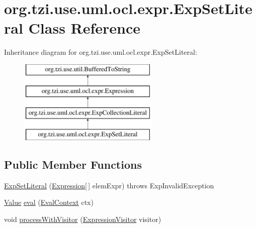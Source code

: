 \hypertarget{classorg_1_1tzi_1_1use_1_1uml_1_1ocl_1_1expr_1_1_exp_set_literal}{\section{org.\-tzi.\-use.\-uml.\-ocl.\-expr.\-Exp\-Set\-Literal Class Reference}
\label{classorg_1_1tzi_1_1use_1_1uml_1_1ocl_1_1expr_1_1_exp_set_literal}
}
Inheritance diagram for org.\-tzi.\-use.\-uml.\-ocl.\-expr.\-Exp\-Set\-Literal\-:\begin{figure}[H]
\begin{center}
\leavevmode
\includegraphics[height=4.000000cm]{classorg_1_1tzi_1_1use_1_1uml_1_1ocl_1_1expr_1_1_exp_set_literal}
\end{center}
\end{figure}
\subsection*{Public Member Functions}
\begin{DoxyCompactItemize}
\item 
\hyperlink{classorg_1_1tzi_1_1use_1_1uml_1_1ocl_1_1expr_1_1_exp_set_literal_ac43c7ba94f6b66019108b0341a8408e0}{Exp\-Set\-Literal} (\hyperlink{classorg_1_1tzi_1_1use_1_1uml_1_1ocl_1_1expr_1_1_expression}{Expression}\mbox{[}$\,$\mbox{]} elem\-Expr)  throws Exp\-Invalid\-Exception     
\item 
\hyperlink{classorg_1_1tzi_1_1use_1_1uml_1_1ocl_1_1value_1_1_value}{Value} \hyperlink{classorg_1_1tzi_1_1use_1_1uml_1_1ocl_1_1expr_1_1_exp_set_literal_ac3f859311bcfd5b0447cc29288eff925}{eval} (\hyperlink{classorg_1_1tzi_1_1use_1_1uml_1_1ocl_1_1expr_1_1_eval_context}{Eval\-Context} ctx)
\item 
void \hyperlink{classorg_1_1tzi_1_1use_1_1uml_1_1ocl_1_1expr_1_1_exp_set_literal_a3c31da34db4df0a890210caf91dd6089}{process\-With\-Visitor} (\hyperlink{interfaceorg_1_1tzi_1_1use_1_1uml_1_1ocl_1_1expr_1_1_expression_visitor}{Expression\-Visitor} visitor)
\end{DoxyCompactItemize}
